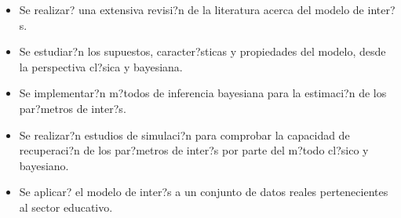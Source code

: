 \begin{itemize}
\item Se realizar? una extensiva revisi?n de la literatura acerca del modelo de inter?s.
\item Se estudiar?n los supuestos, caracter?sticas y propiedades del modelo, desde la perspectiva cl?sica y bayesiana.
\item Se implementar?n m?todos de inferencia bayesiana para la estimaci?n de los par?metros de inter?s.
\item Se realizar?n estudios de simulaci?n para comprobar la capacidad de recuperaci?n de los par?metros de inter?s por parte del m?todo cl?sico y bayesiano.
\item Se aplicar? el modelo de inter?s a un conjunto de datos reales pertenecientes al sector educativo.
\end{itemize}